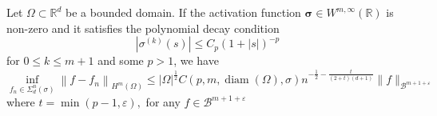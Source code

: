 \begin{theorem}
Let $\Omega\subset \mathbb{R}^d$ be a bounded domain. If the activation function  $\boldsymbol{\sigma} \in W^{m, \infty}(\mathbb{R})$ is non-zero and it satisfies the polynomial decay condition
\begin{equation}\label{eq:assdecay}
\left|\sigma^{(k)}(s)\right| \leq C_{p}(1+|s|)^{-p}
\end{equation}
for $0\le k\le m+1$ and some $p> 1$, we have
\begin{equation}
\inf _{f_{n} \in \Sigma_{d}^{n}(\sigma)}\left\|f-f_{n}\right\|_{H^{m}(\Omega)} \leq|\Omega|^{\frac{1}{2}} C(p, m, \operatorname{diam}(\Omega), \sigma) n^{-\frac{1}{2}-\frac{t}{(2+t)(d+1)}}\|f\|_{\mathscr{B}^{m+1+\varepsilon}}
\end{equation}
where $t=\min (p-1, \varepsilon),$ for any $f \in \mathscr{B}^{m+1+\varepsilon}$
\end{theorem}
